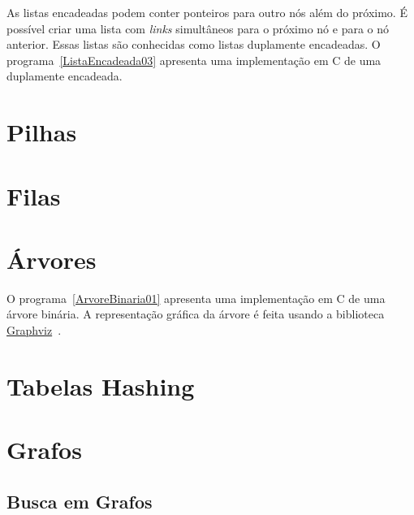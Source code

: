 \documentclass[11pt,fleqn]{book} %
\begin{document}
\newpage
As listas encadeadas podem conter ponteiros para outro nós além do próximo. 
É possível criar uma lista com \textit{links} simultâneos para o próximo nó e para o nó anterior.
Essas listas são conhecidas como listas duplamente encadeadas.
O  programa~\ref{ListaEncadeada03} apresenta uma implementação em C de uma duplamente encadeada.

\label{ListaEncadeada03}



\section{Pilhas}\label{pilhas}

\section{Filas}\label{filas}

\newpage
\section{Árvores}\label{arvores}

O  programa~\ref{ArvoreBinaria01} apresenta uma implementação em C de uma árvore binária.
A representação gráfica da árvore é feita usando a biblioteca \href{http://graphviz.org/}{Graphviz}~\cite{Ellson03graphvizand}.

\label{ArvoreBinaria01}


\section{Tabelas Hashing}\label{hashing}

\section{Grafos}\label{grafos}

\subsection{Busca em Grafos}

\end{document}
